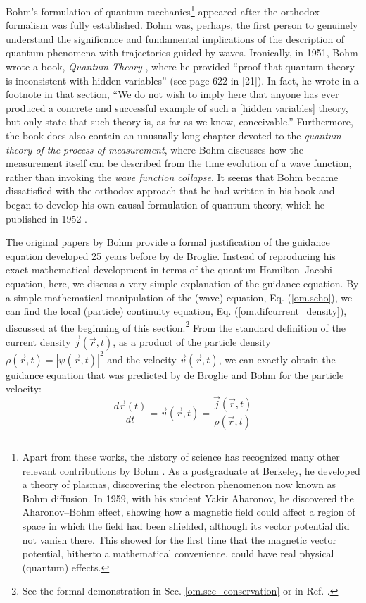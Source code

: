 \documentclass[onecolumn,nofootinbib, secnumarabic, amsmath, nobibnotes,12pt,aps,pra]{revtex4-1}
\newcommand{\sref}[1]{Sec. \ref{#1}}
\newcommand{\eref}[1]{Eq. (\ref{#1})}
\begin{document}
Bohm's formulation of quantum mechanics\footnote{Apart from these
works, the history of science has recognized many other relevant
contributions by Bohm \cite{om.infinite_potential}. As a
postgraduate at Berkeley, he developed a theory of plasmas,
discovering the electron phenomenon now known as Bohm diffusion. In
1959, with his student Yakir Aharonov, he discovered the
Aharonov--Bohm effect, showing how a magnetic field could affect a
region of space in which the field had been shielded, although its
vector potential did not vanish there. This showed for the first
time that the magnetic vector potential, hitherto a mathematical
convenience, could have real physical (quantum) effects.} appeared
after the orthodox formalism was fully established. Bohm was,
perhaps, the first person to genuinely understand the significance
and fundamental implications of the description of quantum phenomena
with trajectories guided by waves. Ironically, in 1951, Bohm wrote a
book, \textit{Quantum Theory} \cite{om.bohmbook}, where he provided
``proof that quantum theory is inconsistent with hidden variables''
(see page 622 in [21]). In fact, he wrote in a footnote in that section,
``We do not wish to imply here that anyone has ever produced a
concrete and successful example of such a [hidden variables] theory,
but only state that such theory is, as far as we know,
conceivable.'' Furthermore, the book does also contain an unusually
long chapter devoted to the \textit{quantum theory of the process of
measurement}, where Bohm discusses how the measurement itself can be
described from the time evolution of a wave function, rather than
invoking the \textit{wave function collapse}. It seems that Bohm
became dissatisfied with the orthodox approach that he had written
in his book and began to develop his own causal formulation of
quantum theory, which he published in 1952
\cite{om.bohm1952a,om.bohm1952b}.

The original papers by Bohm \cite{om.bohm1952a,om.bohm1952b} provide
a formal justification of the guidance equation developed 25 years
before by de Broglie. Instead of reproducing his exact mathematical
development in terms of the quantum Hamilton--Jacobi equation, here, we
discuss a very simple explanation of the guidance equation. By a
simple mathematical manipulation of the (wave) equation,
\eref{om.scho}, we can find the local (particle) continuity
equation, \eref{om.difcurrent_density}, discussed at the beginning
of this section.\footnote{See the formal demonstration in
\sref{om.sec_conservation} or in Ref. \cite{om.cohen}.} From the
standard definition of the current density $\vec{j}(\vec{r},t)$, as
a product of the particle density $\rho(\vec{r},t) =
|\psi(\vec{r},t)|^2$ and the velocity $\vec{v}(\vec{r},t)$, we can
exactly obtain the guidance equation that was predicted by de
Broglie and Bohm for the particle velocity:
\begin{equation}
\label{om.guidance}
\frac{d\vec{r}(t)}{dt} = \vec{v}(\vec{r},t) = \frac{\vec{j}(\vec{r},t)} {\rho(\vec{r},t)}
\end{equation}
\end{document}
